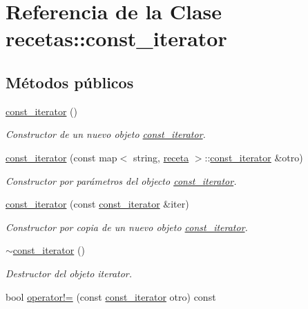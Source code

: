 \hypertarget{classrecetas_1_1const__iterator}{}\section{Referencia de la Clase recetas\+:\+:const\+\_\+iterator}
\label{classrecetas_1_1const__iterator}
\subsection*{Métodos públicos}
\begin{DoxyCompactItemize}
\item 
\hyperlink{classrecetas_1_1const__iterator_aafa502569f7377b27e518f7f057f14b3}{const\+\_\+iterator} ()
\begin{DoxyCompactList}\small\item\em Constructor de un nuevo objeto \hyperlink{classrecetas_1_1const__iterator}{const\+\_\+iterator}. \end{DoxyCompactList}\item 
\hyperlink{classrecetas_1_1const__iterator_a8dce57b1b2de5ec94412fc25f95efe44}{const\+\_\+iterator} (const map$<$ string, \hyperlink{classreceta}{receta} $>$\+::\hyperlink{classrecetas_1_1const__iterator}{const\+\_\+iterator} \&otro)
\begin{DoxyCompactList}\small\item\em Constructor por parámetros del objecto \hyperlink{classrecetas_1_1const__iterator}{const\+\_\+iterator}. \end{DoxyCompactList}\item 
\hyperlink{classrecetas_1_1const__iterator_ad9cbdccd55ffd584e362bed2e30bf8b9}{const\+\_\+iterator} (const \hyperlink{classrecetas_1_1const__iterator}{const\+\_\+iterator} \&iter)
\begin{DoxyCompactList}\small\item\em Constructor por copia de un nuevo objeto \hyperlink{classrecetas_1_1const__iterator}{const\+\_\+iterator}. \end{DoxyCompactList}\item 
\hyperlink{classrecetas_1_1const__iterator_af765fa5516c55d7f59a182f26e9bdbf3}{$\sim$const\+\_\+iterator} ()
\begin{DoxyCompactList}\small\item\em Destructor del objeto iterator. \end{DoxyCompactList}\item 
bool \hyperlink{classrecetas_1_1const__iterator_a133a88a0de923966aa5decab75b47039}{operator!=} (const \hyperlink{classrecetas_1_1const__iterator}{const\+\_\+iterator} otro) const

\end{DoxyCompactItemize}
